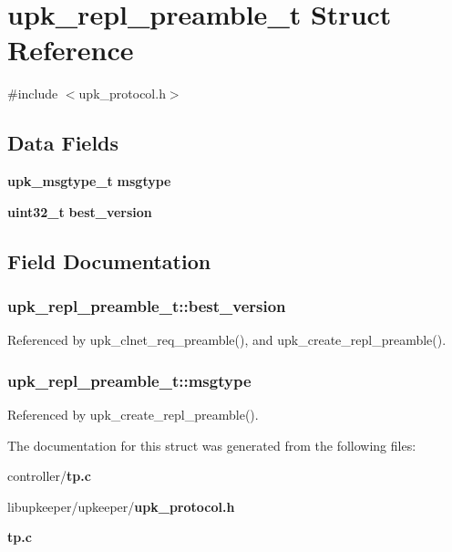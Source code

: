 \section{upk\_\-repl\_\-preamble\_\-t Struct Reference}
\label{structupk__repl__preamble__t}


{\ttfamily \#include $<$upk\_\-protocol.h$>$}

\subsection*{Data Fields}
\begin{DoxyCompactItemize}
\item 
{\bf upk\_\-msgtype\_\-t} {\bf msgtype}
\item 
{\bf uint32\_\-t} {\bf best\_\-version}
\end{DoxyCompactItemize}


\subsection{Field Documentation}
\subsubsection[{best\_\-version}]{ {\bf upk\_\-repl\_\-preamble\_\-t::best\_\-version}}\label{structupk__repl__preamble__t_acb127799abee95f15a59a0097b239658}


Referenced by upk\_\-clnet\_\-req\_\-preamble(), and upk\_\-create\_\-repl\_\-preamble().

\subsubsection[{msgtype}]{ {\bf upk\_\-repl\_\-preamble\_\-t::msgtype}}\label{structupk__repl__preamble__t_a0eaad3473178ed8d37b80a739a0db41b}


Referenced by upk\_\-create\_\-repl\_\-preamble().



The documentation for this struct was generated from the following files:\begin{DoxyCompactItemize}
\item 
controller/{\bf tp.c}\item 
libupkeeper/upkeeper/{\bf upk\_\-protocol.h}\item 
{\bf tp.c}\end{DoxyCompactItemize}
